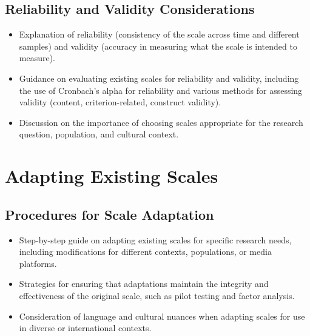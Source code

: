 \documentclass[
]{book}
\begin{document}
\hypertarget{reliability-and-validity-considerations}{%
\subsection*{Reliability and Validity Considerations}\label{reliability-and-validity-considerations}}

\begin{itemize}
\item
  Explanation of reliability (consistency of the scale across time and different samples) and validity (accuracy in measuring what the scale is intended to measure).
\item
  Guidance on evaluating existing scales for reliability and validity, including the use of Cronbach's alpha for reliability and various methods for assessing validity (content, criterion-related, construct validity).
\item
  Discussion on the importance of choosing scales appropriate for the research question, population, and cultural context.
\end{itemize}

\hypertarget{adapting-existing-scales}{%
\section*{Adapting Existing Scales}\label{adapting-existing-scales}}

\hypertarget{procedures-for-scale-adaptation}{%
\subsection*{Procedures for Scale Adaptation}\label{procedures-for-scale-adaptation}}

\begin{itemize}
\item
  Step-by-step guide on adapting existing scales for specific research needs, including modifications for different contexts, populations, or media platforms.
\item
  Strategies for ensuring that adaptations maintain the integrity and effectiveness of the original scale, such as pilot testing and factor analysis.
\item
  Consideration of language and cultural nuances when adapting scales for use in diverse or international contexts.
\end{itemize}
\end{document}
